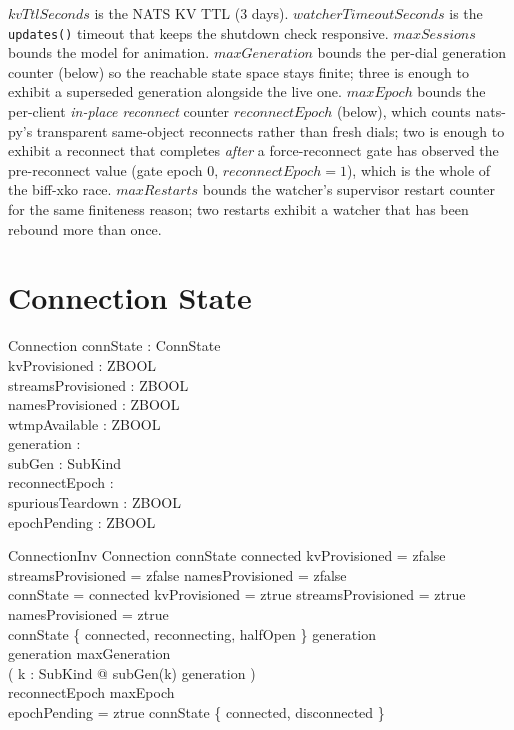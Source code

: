 \documentclass[a4paper,10pt,fleqn]{article}
\begin{document}
$kvTtlSeconds$ is the NATS KV TTL (3 days).
$watcherTimeoutSeconds$ is the \texttt{updates()} timeout that
keeps the shutdown check responsive.  $maxSessions$ bounds the
model for animation.  $maxGeneration$ bounds the per-dial
generation counter (below) so the reachable state space stays
finite; three is enough to exhibit a superseded generation
alongside the live one.  $maxEpoch$ bounds the per-client
\emph{in-place reconnect} counter $reconnectEpoch$ (below), which
counts nats-py's transparent same-object reconnects rather than
fresh dials; two is enough to exhibit a reconnect that completes
\emph{after} a force-reconnect gate has observed the pre-reconnect
value (gate epoch $0$, $reconnectEpoch = 1$), which is the whole
of the biff-xko race.  $maxRestarts$ bounds the watcher's supervisor
restart counter for the same finiteness reason; two restarts exhibit a
watcher that has been rebound more than once.

\section{Connection State}

\begin{schema}{Connection}
  connState : ConnState \\
  kvProvisioned : ZBOOL \\
  streamsProvisioned : ZBOOL \\
  namesProvisioned : ZBOOL \\
  wtmpAvailable : ZBOOL \\
  generation : \nat \\
  subGen : SubKind \fun \nat \\
  reconnectEpoch : \nat \\
  spuriousTeardown : ZBOOL \\
  epochPending : ZBOOL
\end{schema}

\begin{schema}{ConnectionInv}
  Connection
  \where
  connState \neq connected \implies
  kvProvisioned = zfalse \land
  streamsProvisioned = zfalse \land
  namesProvisioned = zfalse \\
  connState = connected \implies
  kvProvisioned = ztrue \land
  streamsProvisioned = ztrue \land
  namesProvisioned = ztrue \\
  connState \in \{ connected, reconnecting, halfOpen \} \implies
  generation  \\
  generation \leq maxGeneration \\
  ( \forall k : SubKind @ subGen(k) \leq generation ) \\
  reconnectEpoch \leq maxEpoch \\
  epochPending = ztrue \implies
  connState \in \{ connected, disconnected \}
\end{schema}
\end{document}
